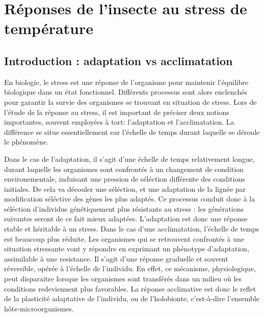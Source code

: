 \chapter{Réponses de l'insecte au stress de température} %
\label{chap:repstress}
	
	\section{Introduction : adaptation vs acclimatation} %
	\label{sec:adaptation_vs_acclimatation}

En biologie, le stress est une réponse de l'organisme pour maintenir l'équilibre
biologique dans un état fonctionnel. Différents processus sont alors enclenchés pour
garantir la survie des organismes se trouvant en situation de stress. Lors de l’étude
de la réponse au stress, il est important de préciser deux notions importantes,
souvent employées à tort: l’adaptation et l’acclimatation. 
La différence se situe essentiellement sur l'échelle de temps durant laquelle
se déroule le phénomène.

Dans le cas de l'adaptation, il s'agit d'une échelle de temps relativement
longue, durant laquelle les organismes sont confrontés à un changement de
condition environementale, induisant une pression de séléction différente des
conditions initiales. De cela va découler une séléction, et une adaptation de
la lignée par modification séléctive des gènes les plus adaptés. 
Ce processus conduit donc à la séléction d’individus génétiquement plus résistants au stress : les générations suivantes seront de ce fait mieux adaptées.
L'adaptation est donc une réponse stable et héritable à un stress.
%
Dans le cas d'une acclimatation, l’échelle de
temps est beaucoup plus réduite. Les organismes qui se retrouvent confrontés à une
situation stressante vont y répondre en exprimant un phénotype
d'adaptation, assimilable à une resistance.
Il s'agit d'une réponse graduelle et souvent réversible, opérée à
l'échelle de l'individu.
En effet, ce mécanisme, physiologique, peut disparaitre lorsque les organismes sont transférés dans un milieu où les conditions redeviennent plus favorables.
La réponse acclimative est donc le reflet de la
plasticité adaptative de l'individu, ou de l'holobionte, c’est-à-dire l’ensemble hôte-microorganismes.

